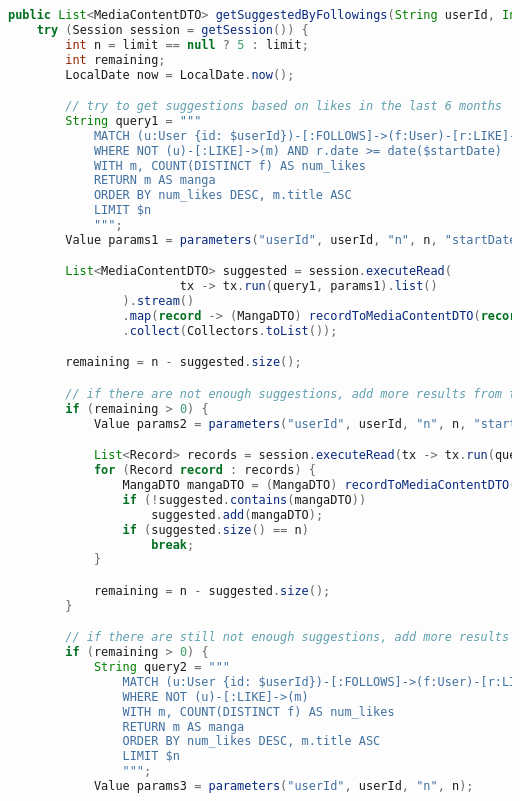 \begin{mdframed}[style=customstyle]
\begin{lstlisting}[language=java]
public List<MediaContentDTO> getSuggestedByFollowings(String userId, Integer limit) throws DAOException {
    try (Session session = getSession()) {
        int n = limit == null ? 5 : limit;
        int remaining;
        LocalDate now = LocalDate.now();

        // try to get suggestions based on likes in the last 6 months
        String query1 = """
            MATCH (u:User {id: $userId})-[:FOLLOWS]->(f:User)-[r:LIKE]->(m:Manga)
            WHERE NOT (u)-[:LIKE]->(m) AND r.date >= date($startDate)
            WITH m, COUNT(DISTINCT f) AS num_likes
            RETURN m AS manga
            ORDER BY num_likes DESC, m.title ASC
            LIMIT $n
            """;
        Value params1 = parameters("userId", userId, "n", n, "startDate", now.minusMonths(6));

        List<MediaContentDTO> suggested = session.executeRead(
                        tx -> tx.run(query1, params1).list()
                ).stream()
                .map(record -> (MangaDTO) recordToMediaContentDTO(record))
                .collect(Collectors.toList());

        remaining = n - suggested.size();

        // if there are not enough suggestions, add more results from the last 2 years
        if (remaining > 0) {
            Value params2 = parameters("userId", userId, "n", n, "startDate", now.minusYears(2));

            List<Record> records = session.executeRead(tx -> tx.run(query1, params2).list());
            for (Record record : records) {
                MangaDTO mangaDTO = (MangaDTO) recordToMediaContentDTO(record);
                if (!suggested.contains(mangaDTO))
                    suggested.add(mangaDTO);
                if (suggested.size() == n)
                    break;
            }

            remaining = n - suggested.size();
        }

        // if there are still not enough suggestions, add more results based on all likes
        if (remaining > 0) {
            String query2 = """
                MATCH (u:User {id: $userId})-[:FOLLOWS]->(f:User)-[r:LIKE]->(m:Manga)
                WHERE NOT (u)-[:LIKE]->(m)
                WITH m, COUNT(DISTINCT f) AS num_likes
                RETURN m AS manga
                ORDER BY num_likes DESC, m.title ASC
                LIMIT $n
                """;
            Value params3 = parameters("userId", userId, "n", n);


\end{lstlisting}
\end{mdframed}
